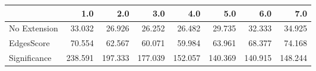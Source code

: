 \begin{tabular}{lrrrrrrr}
\toprule
{} &     1.0 &     2.0 &     3.0 &     4.0 &     5.0 &     6.0 &     7.0 \\
\midrule
No Extension &  33.032 &  26.926 &  26.252 &  26.482 &  29.735 &  32.333 &  34.925 \\
EdgesScore   &  70.554 &  62.567 &  60.071 &  59.984 &  63.961 &  68.377 &  74.168 \\
Significance & 238.591 & 197.333 & 177.039 & 152.057 & 140.369 & 140.915 & 148.244 \\
\bottomrule
\end{tabular}
